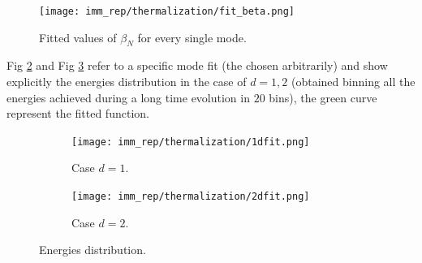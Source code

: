 \documentclass[10pt,a4paper]{article}
\begin{document}
\begin{figure}[h]
	\begin{center}
		\texttt{[image: imm\_rep/thermalization/fit\_beta.png]}
	\end{center}
	\caption{Fitted values of $\beta_N$ for every single mode.}
	\label{fig: fit_beta}
\end{figure}
 Fig \ref{subfig: 1d} and Fig \ref{subfig: 2d} refer to a specific mode fit (the  chosen arbitrarily) and show explicitly the energies distribution in the case of $d=1,2$ (obtained binning all the energies achieved during a long time evolution in $20$ bins), the green curve represent the fitted function.
 
\begin{figure}[h]
	\begin{center}
		\begin{subfigure}[b]{0.4\textwidth}
			\centering
			\texttt{[image: imm\_rep/thermalization/1dfit.png]}
			\caption{Case $d=1$.}
			\label{subfig: 1d}
		\end{subfigure}
		\begin{subfigure}[b]{0.4\textwidth}
			\centering
			\texttt{[image: imm\_rep/thermalization/2dfit.png]}
			\caption{Case $d=2$.}
			\label{subfig: 2d}
		\end{subfigure}
		\caption{Energies distribution.}
	\end{center}
	\label{fig: en_dis}
\end{figure}
 
\end{document}
